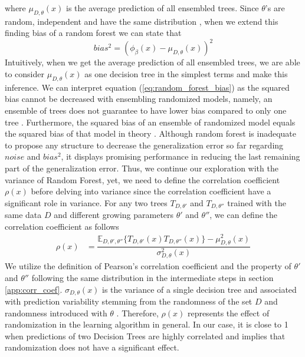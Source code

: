 where $\mu_{D,\theta}(x)$ is the average prediction of all ensembled trees. Since $\theta$'s are random, 
independent and have the same distribution \cite{louppe2014understanding}, when we extend this finding bias of a random forest 
we can state that 
\begin{equation}\label{eq:random_forest_bias}
bias^2 = (\phi_{\beta}(x) - \mu_{D,\theta}(x))^2
\end{equation}
Intuitively, when we get the average prediction of all ensembled trees, 
we are able to consider $\mu_{D,\theta}(x)$ as one decision tree in the simplest terms and make this inference.
We can interpret equation (\ref{eq:random_forest_bias}) as the squared bias cannot be decreased with ensembling randomized models, 
namely, an ensemble of trees does not guarantee to have lower bias compared to only one tree \cite{friedman2001elements}.
Furthermore, the squared bias of an ensemble of randomized model equals 
the squared bias of that model in theory \cite{louppe2014understanding}. 
Although random forest is inadequate to propose any structure to decrease the generalization error so far regarding $noise$ 
and $bias^2$, it displays promising performance in reducing the last remaining part of the generalization error. 
Thus, we continue our exploration with the variance of Random Forest, yet, we need to define the correlation coefficient $\rho(x)$
before delving into variance since the correlation coefficient have a significant role in variance. 
For any two trees $T_{D,\theta'}$ and $T_{D,\theta''}$ trained with the same data $D$
and different growing parameters $\theta'$ and $\theta''$, we can define the correlation coefficient as follows
\begin{align}
	\rho(x) & 
	= \dfrac{\mathbb{E}_{D,\theta',\theta''}\{T_{D,\theta'}(x) T_{D,\theta''}(x)\} 
	- \mu_{D,\theta}^2(x)}{\sigma_{D,\theta}^2(x)}
\end{align}
We utilize the definition of Pearson's correlation coefficient and the property of $\theta'$ and $\theta''$ following 
the same distribution in the intermediate steps in section \ref{app:corr_coef}. 
$\sigma_{D, \theta}(x)$ is the variance of a single decision tree and 
associated with prediction variability stemming from the randomness of the set $D$ 
and randomness introduced with $\theta$ \cite{louppe2014understanding}.
Therefore, $\rho(x)$ represents the effect of randomization in the learning algorithm in general.
In our case, it is close to 1 when predictions of two Decision Trees 
are highly correlated and implies that randomization 
does not have a significant effect. 
